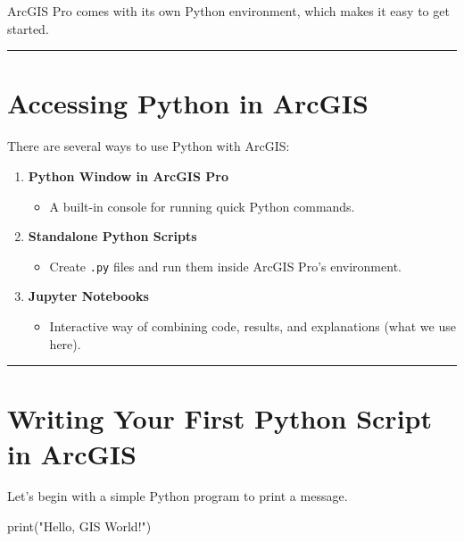 \documentclass[
  11pt,
  letterpaper,
]{book}
\newenvironment{Shaded}{\begin{snugshade}}{\end{snugshade}}
\newcommand{\BuiltInTok}[1]{\textcolor[rgb]{0.00,0.23,0.31}{#1}}
\newcommand{\NormalTok}[1]{\textcolor[rgb]{0.00,0.23,0.31}{#1}}
\newcommand{\StringTok}[1]{\textcolor[rgb]{0.13,0.47,0.30}{#1}}
\providecommand{\tightlist}{%
  \setlength{\itemsep}{0pt}\setlength{\parskip}{0pt}}
\begin{document}
ArcGIS Pro comes with its own Python environment, which makes it easy to
get started.

\begin{center}\rule{0.5\linewidth}{0.5pt}\end{center}

\section{Accessing Python in ArcGIS}\label{accessing-python-in-arcgis}

There are several ways to use Python with ArcGIS:

\begin{enumerate}
\def\labelenumi{\arabic{enumi}.}
\tightlist
\item
  \textbf{Python Window in ArcGIS Pro}

  \begin{itemize}
  \tightlist
  \item
    A built-in console for running quick Python commands.
  \end{itemize}
\item
  \textbf{Standalone Python Scripts}

  \begin{itemize}
  \tightlist
  \item
    Create \texttt{.py} files and run them inside ArcGIS Pro's
    environment.
  \end{itemize}
\item
  \textbf{Jupyter Notebooks}

  \begin{itemize}
  \tightlist
  \item
    Interactive way of combining code, results, and explanations (what
    we use here).
  \end{itemize}
\end{enumerate}

\begin{center}\rule{0.5\linewidth}{0.5pt}\end{center}

\section{Writing Your First Python Script in
ArcGIS}\label{writing-your-first-python-script-in-arcgis}

Let's begin with a simple Python program to print a message.

\begin{Shaded}
\begin{Highlighting}[]
\BuiltInTok{print}\NormalTok{(}\StringTok{"Hello, GIS World!"}\NormalTok{)}
\end{Highlighting}
\end{Shaded}
\end{document}
